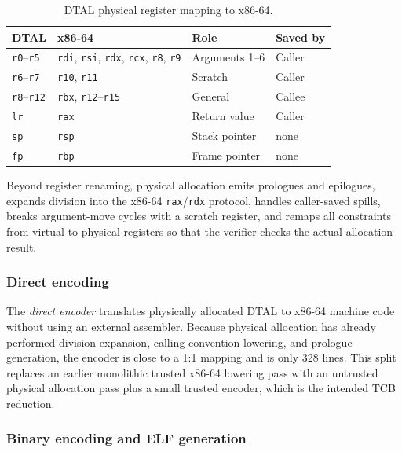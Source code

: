 \begin{table}[h]
\centering
\small
\begin{tabular}{l l l l}
\hline
\textbf{DTAL} & \textbf{x86-64} & \textbf{Role} & \textbf{Saved by} \\
\hline
\texttt{r0}--\texttt{r5} & \texttt{rdi}, \texttt{rsi}, \texttt{rdx}, \texttt{rcx}, \texttt{r8}, \texttt{r9} & Arguments 1--6 & Caller \\
\texttt{r6}--\texttt{r7} & \texttt{r10}, \texttt{r11} & Scratch & Caller \\
\texttt{r8}--\texttt{r12} & \texttt{rbx}, \texttt{r12}--\texttt{r15} & General & Callee \\
\texttt{lr} & \texttt{rax} & Return value & Caller \\
\texttt{sp} & \texttt{rsp} & Stack pointer & none \\
\texttt{fp} & \texttt{rbp} & Frame pointer & none \\
\hline
\end{tabular}
\caption{DTAL physical register mapping to x86-64.}
\label{tab:regmap}
\end{table}

Beyond register renaming, physical allocation emits prologues and epilogues, expands division into the x86-64 \texttt{rax}/\texttt{rdx} protocol, handles caller-saved spills, breaks argument-move cycles with a scratch register, and remaps all constraints from virtual to physical registers so that the verifier checks the actual allocation result.

\subsubsection{Direct encoding}

The \textit{direct encoder} translates physically allocated DTAL to x86-64 machine code without using an external assembler. Because physical allocation has already performed division expansion, calling-convention lowering, and prologue generation, the encoder is close to a 1:1 mapping and is only 328 lines. This split replaces an earlier monolithic trusted x86-64 lowering pass with an untrusted physical allocation pass plus a small trusted encoder, which is the intended TCB reduction.

\subsubsection{Binary encoding and ELF generation}

